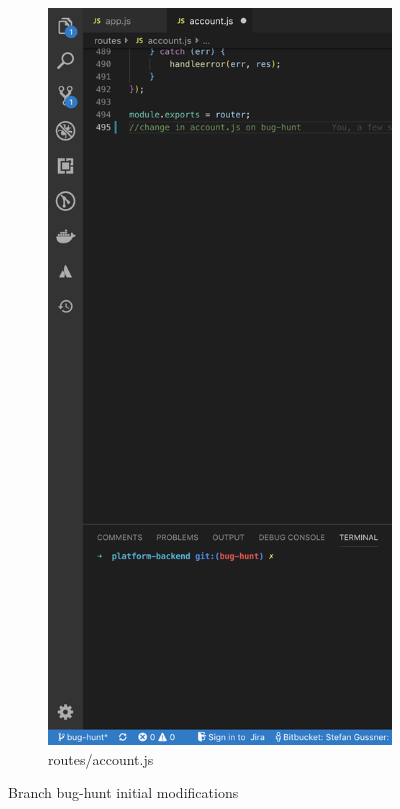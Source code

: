 \begin{figure}[h]
\begin{subfigure}{.5\textwidth}
        \includegraphics[width=1\linewidth]{figures/screenshots/scenarios/1accountjs_on_bughunt.png}
        \caption{routes/account.js}
        \label{fig:1account_on_bughunt}
    \end{subfigure}
    \caption{Branch bug-hunt initial modifications}
\end{figure}

